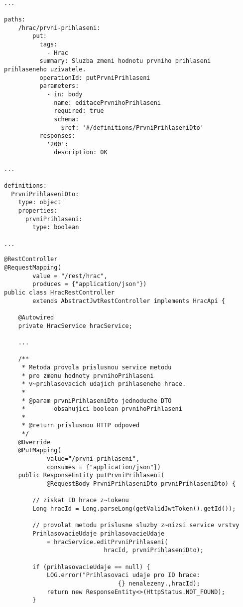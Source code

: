 \documentclass[12pt]{article}
\begin{document}
{
\begin{lstlisting}

...

paths:
    /hrac/prvni-prihlaseni:
        put:
          tags:
            - Hrac
          summary: Sluzba zmeni hodnotu prvniho prihlaseni prihlaseneho uzivatele.
          operationId: putPrvniPrihlaseni
          parameters:
            - in: body
              name: editacePrvnihoPrihlaseni
              required: true
              schema:
                $ref: '#/definitions/PrvniPrihlaseniDto'
          responses:
            '200':
              description: OK
              
...

definitions:
  PrvniPrihlaseniDto:
    type: object
    properties:
      prvniPrihlaseni:
        type: boolean

...

\end{lstlisting}


\begin{lstlisting}
@RestController
@RequestMapping(
        value = "/rest/hrac",
        produces = {"application/json"})
public class HracRestController 
        extends AbstractJwtRestController implements HracApi {
    
    @Autowired
    private HracService hracService;
    
    ...
    
    /**
     * Metoda provola prislusnou service metodu
     * pro zmenu hodnoty prvnihoPrihlaseni
     * v~prihlasovacich udajich prihlaseneho hrace.
     *
     * @param prvniPrihlaseniDto jednoduche DTO 
     *        obsahujici boolean prvnihoPrihlaseni
     *                           
     * @return prislusnou HTTP odpoved
     */
    @Override
    @PutMapping(
            value="/prvni-prihlaseni",
            consumes = {"application/json"})
    public ResponseEntity putPrvniPrihlaseni(
            @RequestBody PrvniPrihlaseniDto prvniPrihlaseniDto) {

        // ziskat ID hrace z~tokenu
        Long hracId = Long.parseLong(getValidJwtToken().getId());

        // provolat metodu prislusne sluzby z~nizsi service vrstvy
        PrihlasovacieUdaje prihlasovacieUdaje
            = hracService.editPrvniPrihlaseni(
                            hracId, prvniPrihlaseniDto);

        if (prihlasovacieUdaje == null) {
            LOG.error("Prihlasovaci udaje pro ID hrace:
                                {} nenalezeny.,hracId);
            return new ResponseEntity<>(HttpStatus.NOT_FOUND);
        }


\end{lstlisting}}
\end{document}
